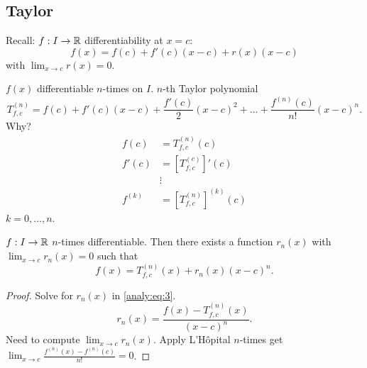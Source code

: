 \documentclass[10pt, a4paper]{article}
\begin{document}
\subsection{Taylor}

Recall:
$f : I \rightarrow \mathbb{R}$ differentiability at $x = c$:
\[
f(x) = f(c) + f'(c)(x - c) + r(x)(x - c)
\]
with $\lim_{x \rightarrow c}r(x) = 0$.

$f(x)$ differentiable $n$-times on $I$.
$n$-th Taylor polynomial
\[
T_{f, c} ^ {(n)} = f(c) + f'(c)(x - c) + \frac{f'(c)}{2}(x - c) ^ 2 + \dotsc + \frac{f ^ {(n)}(c)}{n!}(x - c) ^ n.
\]
Why?
\begin{align*}
    f(c) &= T_{f, c} ^ {(n)}(c) \\
    f'(c) &= \left[T_{f, c} ^ {(c)}\right]'(c) \\
    &\vdots \\
    f ^ {(k)} &= \left[T_{f, c} ^ {(n)}\right] ^ {(k)}(c)
\end{align*}
$k = 0, \dotsc, n$.

\begin{theorem}
    $f : I \rightarrow \mathbb{R}$ $n$-times differentiable.
    Then there exists a function $r_n(x)$ with $\lim_{x \rightarrow c}r_n(x) = 0$ such that
    \begin{equation}\label{analy:eq:3}
        f(x) = T_{f, c} ^ {(n)}(x) + r_n(x)(x - c) ^ n.
    \end{equation}

    \begin{proof}
        Solve for $r_n(x)$ in \eqref{analy:eq:3}.
        \[
        r_n(x) = \frac{f(x) - T_{f, c} ^{(n)}(x)}{(x - c) ^ n}.
        \]
        Need to compute $\lim_{x \rightarrow c}r_n(x)$.
        Apply L'H\^opital $n$-times get $\lim_{x \rightarrow c}\frac{f ^ {(n)}(x) - f ^ {(n)}(c)}{n!} = 0$.
    \end{proof}
\end{theorem}
\end{document}
